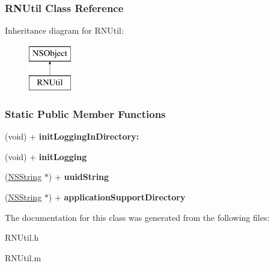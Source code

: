 \hypertarget{interface_r_n_util}{
\subsubsection{RNUtil Class Reference}
\label{interface_r_n_util}
}
Inheritance diagram for RNUtil:\begin{figure}[h]
\begin{center}
\leavevmode
\includegraphics[height=2.000000cm]{interface_r_n_util}
\end{center}
\end{figure}
\subsubsection*{Static Public Member Functions}
\begin{DoxyCompactItemize}
\item 
\hypertarget{interface_r_n_util_a2f33e053f5bf7f89862e2959cbe80f46}{
(void) + {\bfseries initLoggingInDirectory:}}
\label{interface_r_n_util_a2f33e053f5bf7f89862e2959cbe80f46}

\item 
\hypertarget{interface_r_n_util_a980d14de8f77a6252772edb9bbe142e8}{
(void) + {\bfseries initLogging}}
\label{interface_r_n_util_a980d14de8f77a6252772edb9bbe142e8}

\item 
\hypertarget{interface_r_n_util_a6c32494270771ec2e147ae4458ab2f5f}{
(\hyperlink{class_n_s_string}{NSString} $\ast$) + {\bfseries uuidString}}
\label{interface_r_n_util_a6c32494270771ec2e147ae4458ab2f5f}

\item 
\hypertarget{interface_r_n_util_a7b24c806ea5f98e5dbf5459d478822b2}{
(\hyperlink{class_n_s_string}{NSString} $\ast$) + {\bfseries applicationSupportDirectory}}
\label{interface_r_n_util_a7b24c806ea5f98e5dbf5459d478822b2}

\end{DoxyCompactItemize}


The documentation for this class was generated from the following files:\begin{DoxyCompactItemize}
\item 
RNUtil.h\item 
RNUtil.m\end{DoxyCompactItemize}
